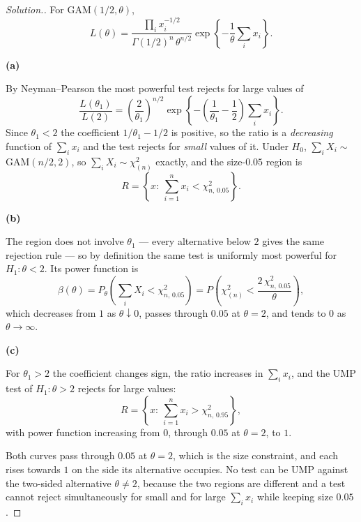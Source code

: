 \documentclass[12pt,a4paper]{report}
\theoremstyle{definition}
\newcommand{\subhead}[1]{%
  \par\medskip\noindent\textbf{#1}\par\nobreak\smallskip}
\newenvironment{solution}
  {\renewcommand{\qedsymbol}{}\begin{proof}[\textit{Solution}.]}
  {\end{proof}}
\begin{document}
\begin{solution}
For GAM$(1/2,\theta)$,
\[L(\theta) = \frac{\prod_i x_i^{-1/2}}{\Gamma(1/2)^{n}\,\theta^{n/2}}
\exp\left\{-\frac{1}{\theta}\sum_i x_i\right\}.\]

\subhead{(a)}
By Neyman--Pearson the most powerful test rejects for large values of
\[\frac{L(\theta_1)}{L(2)} = \left(\frac{2}{\theta_1}\right)^{n/2}
\exp\left\{-\left(\frac{1}{\theta_1}-\frac12\right)\sum_i x_i\right\}.\]
Since $\theta_1<2$ the coefficient $1/\theta_1-1/2$ is positive, so the ratio is
a \emph{decreasing} function of $\sum_i x_i$ and the test rejects for
\emph{small} values of it. Under $H_0$, $\sum_i X_i\sim$ GAM$(n/2,2)$, so
$\sum_i X_i \sim \chi^{2}_{(n)}$ exactly, and the size-$0.05$ region is
\[R = \left\{x:\ \sum_{i=1}^{n}x_i < \chi^{2}_{n,\,0.05}\right\}.\]

\subhead{(b)}
The region does not involve $\theta_1$ --- every alternative below $2$ gives the
same rejection rule --- so by definition the same test is uniformly most
powerful for $H_1:\theta<2$. Its power function is
\[\beta(\theta) = P_{\theta}\left(\sum_i X_i < \chi^{2}_{n,\,0.05}\right)
= P\left(\chi^{2}_{(n)} < \frac{2\,\chi^{2}_{n,\,0.05}}{\theta}\right),\]
which decreases from $1$ as $\theta\downarrow0$, passes through $0.05$ at
$\theta=2$, and tends to $0$ as $\theta\rightarrow\infty$.

\subhead{(c)}
For $\theta_1>2$ the coefficient changes sign, the ratio increases in
$\sum_i x_i$, and the UMP test of $H_1:\theta>2$ rejects for large values:
\[R = \left\{x:\ \sum_{i=1}^{n}x_i > \chi^{2}_{n,\,0.95}\right\},\]
with power function increasing from $0$, through $0.05$ at $\theta=2$, to $1$.

\begin{center}
\end{center}
Both curves pass through $0.05$ at $\theta=2$, which is the size constraint, and
each rises towards $1$ on the side its alternative occupies. No test can be UMP
against the two-sided alternative $\theta\neq2$, because the two regions are
different and a test cannot reject simultaneously for small and for large
$\sum_i x_i$ while keeping size $0.05$.
\end{solution}
\end{document}

